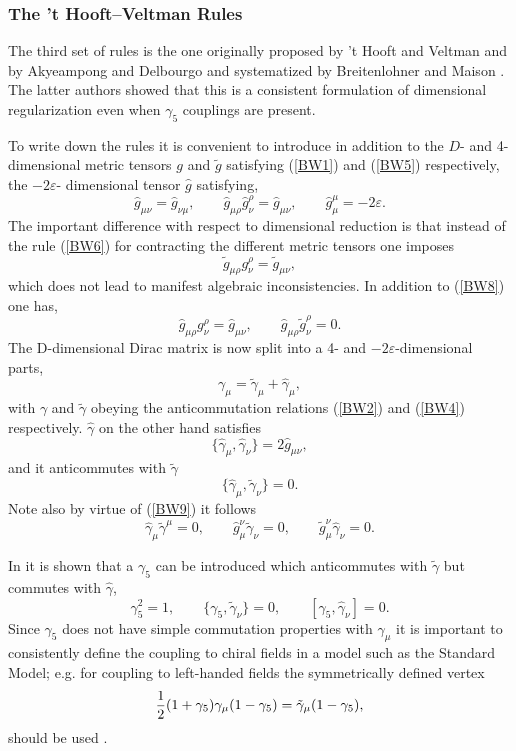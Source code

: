 \documentclass[12pt,rotate]{article}
\def\gat{\tilde{\gamma}}
\def\gh{\hat{g}}
\def\gt{\tilde{g}}
\def\gah{\hat{\gamma}}
\def\ga{\gamma}
\def\gaf{\gamma_{5}}
\newcommand{\be}{\begin{equation}}
\newcommand{\ee}{\end{equation}}
\begin{document}
\begin{itemize}
 \subsubsection{The 't Hooft--Veltman Rules}
 The third set of rules is the one originally proposed by 't Hooft and
 Veltman
 \cite{HV} and by Akyeampong and Delbourgo \cite{AD} and systematized by
 Breitenlohner and Maison \cite{BM}. The latter authors showed that this is
 a consistent formulation of dimensional regularization even when 
$\gamma_5$
 couplings are present.
 
 To write down the rules it is convenient to introduce in addition to the
 $D$- and 4- dimensional metric tensors $g$ and $\gt$
 satisfying (\ref{BW1}) and (\ref{BW5}) respectively, 
the $-2\varepsilon$- dimensional tensor $\gh$ satisfying,
\be\label{BW7}
 \gh_{\mu \nu} = \gh_{\nu \mu}, \qquad
 \gh_{\mu \rho} \gh^{\rho}_{\nu} = \gh_{\mu \nu}, \qquad
 \gh_{\mu}^{\mu} = -2\varepsilon.
\ee
 The important difference with respect to dimensional reduction is that
 instead of the rule (\ref{BW6}) for contracting
 the different metric tensors one imposes
\be\label{BW8}
 \gt_{\mu \rho} g^{\rho}_{\nu} = \gt_{\mu \nu},
\ee
 which does not lead to manifest algebraic inconsistencies. In addition to
 (\ref{BW8}) one has,
\be\label{BW9}
 \gh_{\mu \rho} g^{\rho}_{\nu} = \gh_{\mu \nu},  \qquad
 \gh_{\mu \rho} \gt^{\rho}_{\nu} = 0.
\ee
 The D-dimensional Dirac matrix
 is now split into a 4- and $-2\varepsilon$-dimensional parts,
\be\label{BW10}
  \gamma_{\mu} = \gat_{\mu} + \gah_{\mu},
\ee
 with $\gamma$ and $\gat$ obeying the anticommutation relations 
(\ref{BW2})
 and (\ref{BW4}) respectively. $\gah$ on the other hand satisfies
\be\label{BW11}
 \{ \gah_{\mu} , \gah_{\nu} \} = 2 \gh_{\mu \nu},
\ee
 and it anticommutes with $\gat$
\be\label{BW12}
 \{ \gah_{\mu} , \gat_{\nu} \} = 0.
\ee
 Note also by virtue of (\ref{BW9}) it follows
\be\label{BW13}
  \gah_{\mu} \gat^{\mu}  = 0, \qquad
  \gh_{\mu}^{ \nu} \gat_{\nu}  = 0, \qquad
  \gt_{\mu}^{ \nu} \gah_{\nu}  = 0.
\ee
 
 In \cite{BM} it is shown that a $\gamma_5$ can be introduced which
 anticommutes with $\gat$ but commutes with $\gah$,
\be\label{BW14}
 \gamma_5^{2} =1 , \qquad
 \{ \gamma_5 , \gat_{\nu} \} = 0, \qquad
 [ \gamma_5 , \gah_{\nu} ] = 0.
\ee
 Since $\gamma_5$ does not have simple commutation properties
 with $\gamma_{\mu}$ it
 is important to consistently define the coupling to chiral fields in a
 model such as the Standard Model; e.g.
 for coupling to left-handed fields the symmetrically defined vertex
\be\label{BW15}
 {{1}\over{2}} (1 + \gaf) \ga_{\mu} (1 - \gaf)  = \gat_{\mu} (1 - \gaf),
\ee
 should be used \cite{KNS}.
 

\end{itemize}
\end{document}
